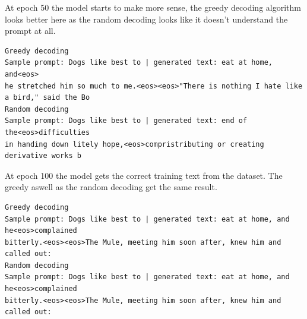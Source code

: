 \documentclass{article}
\begin{document}
At epoch 50 the model starts to make more sense, the greedy decoding algorithm looks better here as the random decoding looks like it doesn't understand the prompt at all.
\begin{lstlisting}
Greedy decoding
Sample prompt: Dogs like best to | generated text: eat at home, and<eos>
he stretched him so much to me.<eos><eos>"There is nothing I hate like a bird," said the Bo
Random decoding
Sample prompt: Dogs like best to | generated text: end of the<eos>difficulties 
in handing down litely hope,<eos>compristributing or creating derivative works b

\end{lstlisting}
At epoch 100 the model gets the correct training text from the dataset. The greedy aswell as the random decoding get the same result.
\begin{lstlisting}
Greedy decoding
Sample prompt: Dogs like best to | generated text: eat at home, and he<eos>complained 
bitterly.<eos><eos>The Mule, meeting him soon after, knew him and called out:
Random decoding
Sample prompt: Dogs like best to | generated text: eat at home, and he<eos>complained 
bitterly.<eos><eos>The Mule, meeting him soon after, knew him and called out:

\end{lstlisting}
\clearpage
\end{document}
